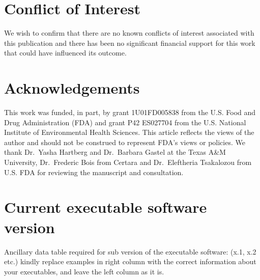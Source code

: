 \documentclass[preprint,12pt, a4paper]{elsarticle}
\begin{document}
\section{Conflict of Interest}

We wish to confirm that there are no known conflicts of interest associated with this publication and there has been no significant financial support for this work that could have influenced its outcome.

\section*{Acknowledgements}
\label{}

This work was funded, in part, by grant 1U01FD005838 from the U.S. Food
and Drug Administration (FDA) and grant P42 ES027704 from the U.S.
National Institute of Environmental Health Sciences. This article
reflects the views of the author and should not be construed to
represent FDA's views or policies. We thank Dr.~Yasha Hartberg and
Dr.~Barbara Gastel at the Texas A\&M University, Dr.~Frederic Bois from
Certara and Dr.~Eleftheria Tsakalozou from U.S. FDA for reviewing the
manuscript and consultation.







 



\section*{Current executable software version}
\label{}

Ancillary data table required for sub version of the executable software: (x.1, x.2 etc.) kindly replace examples in right column with the correct information about your executables, and leave the left column as it is.
\end{document}
